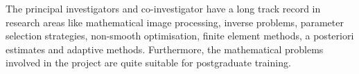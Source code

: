 \documentclass[enabledeprecatedfontcommands,cleardoublepage=empty,headsepline,twoside,11pt,DIV=15,BCOR=12mm,final]{scrartcl}
\begin{document}


The principal investigators and co-investigator have a long track record in research areas like mathematical image processing, inverse problems, parameter selection strategies, non-smooth optimisation, finite element methods, a posteriori estimates and adaptive methods. Furthermore, the mathematical problems involved in the project are quite suitable for postgraduate training.




\end{document}
